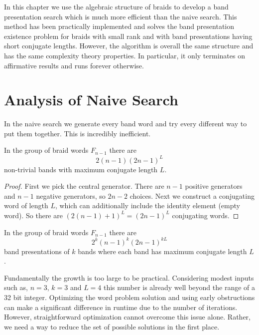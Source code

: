 \documentclass[12pt]{thesis}
\begin{document}
In this chapter we use the algebraic structure of braids to develop a band presentation search which is much more
efficient than the naive search.
This method has been practically implemented and
solves the band presentation existence problem for braids with small rank and with band presentations having short
conjugate lengths.
However, the algorithm is overall the same structure and has the same complexity theory properties.
In particular, it only terminates on affirmative results
and runs forever otherwise. 

\section{Analysis of Naive Search}

In the naive search we generate every band word and try every different way to put them together.
This is incredibly inefficient.
\begin{proposition}
    In the group of braid words $F_{n-1}$ there are
    \begin{equation}
        2(n-1)(2n - 1)^{L}
    \end{equation}
    non-trivial bands with maximum conjugate length $L$.
\end{proposition}
\begin{proof}
    First we pick the central generator.
    There are $n-1$ positive generators and $n - 1$ negative generators,
    so $2n-2$ choices.
    Next we construct a conjugating word of length $L$, which can additionally include the identity element (empty word).
    So there are $(2(n-1) + 1)^{L} = (2n - 1)^{L}$ conjugating words.
\end{proof}

\begin{corollary}
    In the group of braid words $F_{n-1}$ there are
    \begin{equation}
        2^{k}(n-1)^{k}(2n-1)^{kL}
    \end{equation}
    band presentations of $k$ bands
    where each band has maximum conjugate length $L$.
\end{corollary}

Fundamentally the growth is too large to be practical.
Considering modest inputs such as, $n = 3$, $k = 3$ and $L = 4$ this number is already well beyond
the range of a 32 bit integer.
Optimizing the word problem solution and using early obstructions can make a significant difference in runtime due
to the number of iterations.
However, straightforward optimization cannot overcome this issue alone.
Rather, we need a way to reduce the set of possible solutions in the first place.
\end{document}
